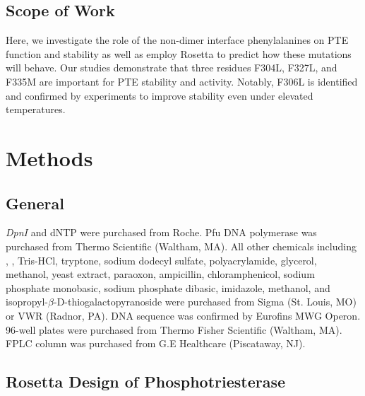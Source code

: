 \begin{refsection}
\subsection{Scope of Work}

Here, we investigate the role of the non-dimer interface phenylalanines on PTE
function and stability as well as employ Rosetta to predict how these mutations
will behave. Our studies demonstrate that three residues F304L, F327L, and
F335M are important for PTE stability and activity. Notably, F306L is
identified and confirmed by experiments to improve stability even under
elevated temperatures.

\section{Methods}

\subsection{General}

\emph{DpnI} and dNTP were purchased from Roche. Pfu DNA polymerase was
purchased from Thermo Scientific (Waltham, MA). All other chemicals including
, , Tris-HCl, tryptone, sodium dodecyl sulfate,
polyacrylamide, glycerol, methanol, yeast extract, paraoxon, ampicillin,
chloramphenicol, sodium phosphate monobasic, sodium phosphate dibasic,
imidazole, methanol, and  isopropyl-$\beta$-D-thiogalactopyranoside were
purchased from Sigma (St. Louis, MO) or VWR (Radnor, PA). DNA sequence was
confirmed by Eurofins MWG Operon.  96-well plates were purchased from Thermo
Fisher Scientific (Waltham, MA). FPLC column was purchased from G.E Healthcare
(Piscataway, NJ). 

\subsection{Rosetta Design of Phosphotriesterase}


\end{refsection}
